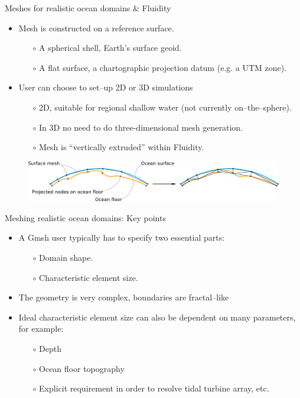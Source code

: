 \documentclass[t]{beamer}
\begin{document}
\begin{frame}{Meshes for realistic ocean domains \& Fluidity}
\begin{itemize}
    \item Mesh is constructed on a reference surface.
    \begin{itemize}
        \item[$\circ$] A spherical shell, Earth's surface geoid.
        \item[$\circ$] A flat surface, a chartographic projection datum (e.g. a UTM zone).
    \end{itemize}
    \item User can choose to set--up 2D or 3D simulations
    \begin{itemize}
        \item[$\circ$] 2D, suitable for regional shallow water (not currently on--the--sphere).
        \item[$\circ$] In 3D no need  to do three-dimensional mesh generation.
        \item[$\circ$] Mesh is ``vertically extruded'' within Fluidity.
    \end{itemize}
\end{itemize}
\begin{figure}[htbp!]
 \centering
  \includegraphics[width=1.0\textwidth]{../figures/mesh_extrusion.png}
\end{figure}
\end{frame}

\begin{frame}{Meshing realistic ocean domains: Key points}
\begin{itemize}
   \item A Gmsh user typically has to specify two essential parts:
   \begin{itemize}
      \item[$\circ$] Domain shape.
      \item[$\circ$] Characteristic element size.
   \end{itemize}\vspace{20pt}
   \item The geometry is very complex, boundaries are fractal--like
   \item Ideal characteristic element size can also be dependent on many parameters, for example:
   \begin{itemize}
       \item[$\circ$] Depth
       \item[$\circ$] Ocean floor topography
       \item[$\circ$] Explicit requirement in order to resolve tidal turbine array, etc.
   \end{itemize}
\end{itemize}
\end{frame}
\end{document}
